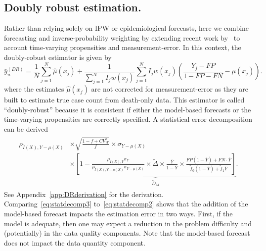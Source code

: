 \documentclass[11pt]{amsart}
\numberwithin{equation}{section}
\theoremstyle{plain}
\begin{document}
%


\subsection{Doubly robust estimation.}
Rather than relying solely on IPW or epidemiological forecasts, here we combine forecasting and inverse-probability weighting by extending recent work by~\cite{Chen2019} to account time-varying propensities and measurement-error. In this context, the doubly-robust estimator is given by
$$
\bar y_{n}^{(DR)} = \frac{1}{N} \sum_{j=1}^N \hat \mu (x_j) + \frac{1}{\sum_{j=1}^N I_j w (x_j)} \sum_{j=1}^N I_j w(x_j) \left( \frac{Y_j - FP}{1 - FP - FN} - \mu(x_j) \right).
$$
where the estimates $\hat \mu(x_j)$ are not corrected for measurement-error as they are built to estimate true case count from death-only data. This estimator is called ``doubly-robust'' because it is consistent if either the model-based forecasts or the time-varying propensities are correctly specified. A statistical error decomposition can be derived
\begin{align}
\label{eq:statdecomp3}
\begin{split}
\rho_{\tilde I (X), Y-\mu(X)} &\times \sqrt{\frac{1-f+ CV^2_W}{f}} \times \sigma_{Y-\mu(X)}  \\
&\times \underbrace{\left[ 1 - \frac{\rho_{\tilde I(X),Y} \sigma_{Y}}{\rho_{\tilde I(X),Y-\mu(X)} \sigma_{Y-\mu(X)}} \times \tilde \Delta \times \frac{\bar Y}{1-\bar Y} \times \frac{FP(1-\bar Y) + FN \cdot \bar Y}{\tilde f_0 (1-\bar Y) + \tilde f_1 \bar Y} \right]}_{\tilde D_M}.
\end{split}
\end{align}
See Appendix~\ref{app:DRderivation} for the derivation. Comparing~\eqref{eq:statdecomp3} to~\eqref{eq:statdecomp2} shows that the addition of the model-based forecast impacts the estimation error in two ways.  First, if the model is adequate, then one may expect a reduction in the problem difficulty and (potentially) in the data quality components. Note that the model-based forecast does not impact the data quantity component.
\end{document}
